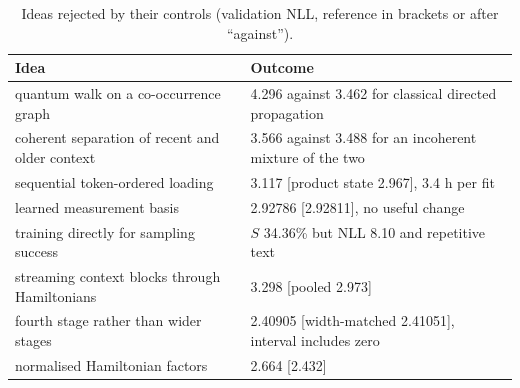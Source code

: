 \documentclass[11pt,a4paper]{article}
\begin{document}
  \begin{table}[H]
    \centering\small
    \caption{Ideas rejected by their controls (validation NLL, reference in brackets or after ``against'').}
    \label{tab:rejected}
    \begin{tabularx}{\linewidth}{@{}lL@{}}
      \toprule
      Idea                                            & Outcome                                                    \\
      \midrule
      quantum walk on a co-occurrence graph           & 4.296 against 3.462 for classical directed propagation \\
      coherent separation of recent and older context & 3.566 against 3.488 for an incoherent mixture of the two           \\
      sequential token-ordered loading                & 3.117 [product state 2.967], 3.4 h per fit                 \\
      learned measurement basis                       & 2.92786 [2.92811], no useful change                        \\
      training directly for sampling success          & $S$ 34.36\% but NLL 8.10 and repetitive text               \\
      streaming context blocks through Hamiltonians   & 3.298 [pooled 2.973]                                       \\
      fourth stage rather than wider stages           & 2.40905 [width-matched 2.41051], interval includes zero    \\
      normalised Hamiltonian factors                  & 2.664 [2.432]                                              \\
      \bottomrule
    \end{tabularx}
  \end{table}
\end{document}
